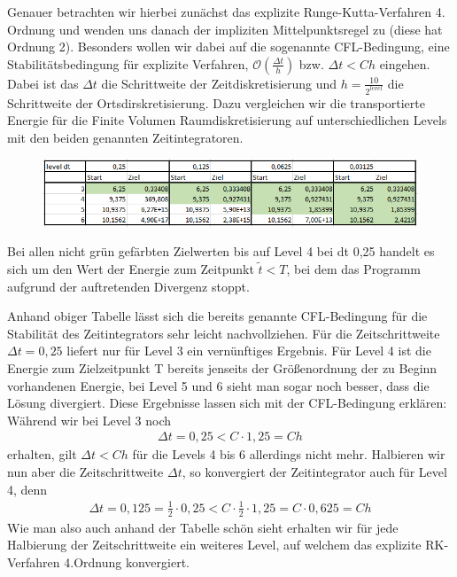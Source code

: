 	Genauer betrachten wir hierbei zunächst das explizite Runge-Kutta-Verfahren 4. Ordnung und wenden uns danach der impliziten Mittelpunktsregel zu (diese hat Ordnung 2). Besonders wollen wir dabei auf die sogenannte CFL-Bedingung, eine Stabilitätsbedingung für explizite Verfahren,  $\mathcal{O}(\frac{\Delta t}{h})$ bzw. $\Delta t < Ch$ eingehen. Dabei ist das $\Delta t$ die Schrittweite der Zeitdiskretisierung und $h = \frac{10}{2^{level} }$ die Schrittweite der Ortsdirskretisierung. 
	Dazu vergleichen wir die transportierte Energie für die Finite Volumen Raumdiskretisierung auf unterschiedlichen Levels mit den beiden genannten Zeitintegratoren.

\begin{figure}[H]
	\centering
	\includegraphics[width=\textwidth]{../Aufgabe21/tabellefarbig.png}
\end{figure}
\begin{remark}
	Bei allen nicht grün gefärbten Zielwerten bis auf Level 4 bei dt 0,25 handelt es sich um den Wert der Energie zum Zeitpunkt $\tilde{t}<T$,  bei dem das Programm aufgrund der auftretenden Divergenz stoppt.
\end{remark}
Anhand obiger Tabelle lässt sich die bereits genannte CFL-Bedingung für die Stabilität des Zeitintegrators sehr leicht nachvollziehen. \newline
Für die Zeitschrittweite $\Delta t = 0,25$ liefert nur für Level 3 ein vernünftiges Ergebnis. Für Level 4 ist die Energie zum Zielzeitpunkt T bereits jenseits der Größenordnung der zu Beginn vorhandenen Energie, bei Level 5 und 6 sieht man sogar noch besser, dass die Lösung divergiert. Diese Ergebnisse lassen sich mit der CFL-Bedingung erklären: \newline
Während wir bei Level 3 noch 
\begin{align*}
	\Delta t = 0,25 < C \cdot 1,25  = Ch
\end{align*} 
erhalten, gilt $ \Delta t < Ch$ für die Levels 4 bis 6 allerdings nicht mehr.
Halbieren wir nun aber die Zeitschrittweite $\Delta t$, so konvergiert der Zeitintegrator auch für Level 4, denn
\begin{align*}
	\Delta t =0,125 =  \frac{1}{2} \cdot 0,25 < C \cdot  \frac{1}{2} \cdot 1,25  =C \cdot 0,625 = Ch
\end{align*}
Wie man also auch anhand der Tabelle schön sieht erhalten wir für jede Halbierung der Zeitschrittweite ein weiteres Level, auf welchem das explizite RK-Verfahren 4.Ordnung konvergiert. 

